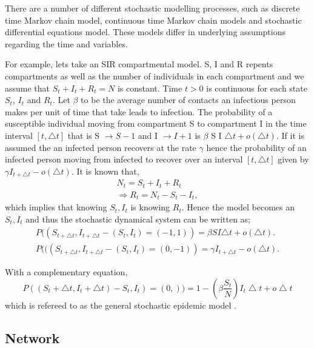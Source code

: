   There are a number of different stochastic modelling processes, such as discrete time Markov chain model, continuous time Markov chain models and stochastic differential equations model. These models differ in underlying assumptions regarding the time and variables.
 
 For example, lets take an SIR compartmental model. S, I and R repents compartments as well as the number of individuals in each compartment and we assume that $S_t + I_t+ R_t = N $ is constant. Time $t>0$ is continuous for each state $S_t$, $I_t$ and $R_t$.
Let $\beta$ to be the average number of contacts an infectious person makes per unit of time that take leads to infection. The probability of a susceptible individual moving from compartment S to compartment I in the time interval $\left[ t,\triangle t \right]$ that is S $\rightarrow S-1$ and I $\rightarrow I + 1 $ is $ \beta$ S I $ \triangle t + o (\triangle t) $. If it is assumed the an infected person recovers at the rate $\gamma$ hence the probability of an infected person moving from infected to recover over an interval $\left[ t,\triangle t \right]$ given by $\gamma I_ {t + \triangle t} -o (\triangle t) $. It is known that,
 \begin{align*}
 N_t = S_t + I_t + R_t
 \\ \Rightarrow  R_t = N_t - S_t - I_t,
\end{align*}  
which implies that knowing $S_t,I_t$ is knowing $R_t$. Hence the model becomes an $S_t,I_t$ and thus the stochastic dynamical system can be written as;
 \begin{align}
 P((S_{t + \triangle t}, I_{t + \triangle t} - (S_t ,I_t) = ( - 1,1)) =  \beta S I  \triangle t + o (\triangle t).
 \\ P (((S_{t + \triangle t}, I_{t + \triangle t} - (S_t ,I_t) = ( 0,-1)) = \gamma I_{t + \triangle t} -o (\triangle t).
 \end{align} 
 
With a complementary equation,
\begin{equation}
P((S_t + \bigtriangleup t, I_t+ \bigtriangleup t) - S_t, I_t) =(0,)) = 1 -\left( \beta \dfrac{ S_t}{N}\right) I_t \bigtriangleup t + o\bigtriangleup t
\end{equation}
which is refereed to as the general stochastic  epidemic model \cite{greenwood2009stochastic}.
 
\subsection{Network}


